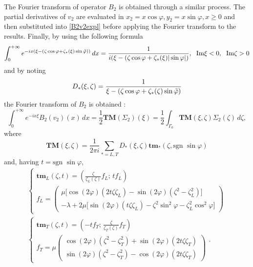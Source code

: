 The Fourier transform of operator $B_2$ is obtained  through a similar process. The partial derivatives of $v_2$ are evaluated in $x_2=x\cos\varphi,y_2=x\sin\varphi,x\geq0$ and then substituted into \eqref{B2v2expl} before applying the Fourier transform to the results. Finally, by using the following formula
\begin{equation}
\int_0^{+\infty} e^{-ix(\xi-(\zeta \cos \varphi + \zeta_*(\xi) \sin\tilde{\varphi}))}\,dx=\frac{1}{i(\xi-(\zeta \cos \varphi + \zeta_*(\xi)| \sin \varphi|)}, \; \mbox{ Im}\xi <0, \;  \mbox{ Im} \zeta>0 
\end{equation}
and by noting
\begin{equation}
D_*(\xi,\zeta)=\frac{1}{\xi-(\zeta \cos \varphi + \zeta_*(\zeta) \sin\tilde{\varphi})}
\end{equation}
the Fourier transform of $B_2$ is obtained :
\begin{equation}
\int_0^{+\infty} e^{-ix\xi}B_2(v_2)(x)\,dx=\frac{1}{2}\textbf{TM}(\Sigma_2)(\xi) =\frac{1}{2} \int_{\Gamma_0}\textbf{TM}(\xi,\zeta)\Sigma_2(\zeta)\,d\zeta,
\label{B2TM}
\end{equation}
where
\begin{equation}
\textbf{TM}(\xi,\zeta)=\frac{1}{2\pi i}\sum_{*=L,T}D_*(\xi,\zeta)\textbf{tm}_*(\zeta,\mbox{sgn } \sin \varphi)
\label{defTM}
\end{equation}
and, having $t = \mbox{sgn } \sin \varphi$,
\begin{gather}
\left\{
\begin{matrix}
\textbf{tm}_L(\zeta,t)=\left( \frac{\zeta}{\zeta_L(\zeta)}f_L ; \, tf_L \right) \\
f_L = \begin{pmatrix}
\mu \lbrack \cos(2\varphi)(2t\zeta\zeta_L)-\sin(2\varphi)(\zeta^2-\zeta_L^2) \rbrack \\
-\lambda+2\mu\lbrack \sin(2\varphi)(t\zeta\zeta_L) -\zeta^2 \sin^2\varphi-\zeta_L^2\cos^2\varphi \rbrack
\end{pmatrix}
\end{matrix}
\right. \label{tmL}
\\
\left\{
\begin{matrix}
\textbf{tm}_T(\zeta,t)=\left(-tf_T; \, \frac{\zeta}{\zeta_T(\zeta)} f_T\right) \\
f_T=\mu \begin{pmatrix}
\cos(2\varphi)(\zeta^2-\zeta^2_T)+\sin(2\varphi)(2t\zeta\zeta_T)\\
\sin(2\varphi)(\zeta^2-\zeta^2_T)-\cos(2\varphi)(2t\zeta\zeta_T)
\end{pmatrix}
\end{matrix}
\right. .
\label{tmT}
\end{gather}

